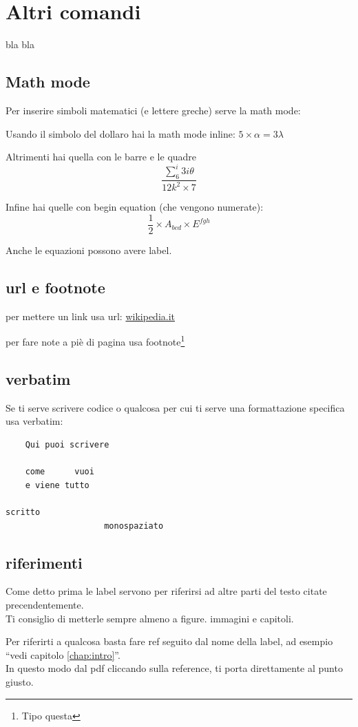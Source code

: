 \documentclass[12pt,a4paper,twoside]{book}
\begin{document}
\chapter{Altri comandi}
bla bla
\section{Math mode}
Per inserire simboli matematici (e lettere greche) serve la math mode:

Usando il simbolo del dollaro hai la math mode inline: $5 \times \alpha = 3\lambda$

Altrimenti hai quella con le barre e le quadre \[ \frac{\sum_6^i 3i\theta}{12k^2\times 7}\]

Infine hai quelle con begin equation (che vengono numerate):
\begin{equation}
    \frac{1}{2}\times A_{bcd}\times E^{fgh}
\end{equation}

Anche le equazioni possono avere label.
\section{url e footnote}
per mettere un link usa url: \url{wikipedia.it}

per fare note a piè di pagina usa footnote\footnote{Tipo questa}
\section{verbatim}
Se ti serve scrivere codice o qualcosa per cui ti serve una formattazione specifica usa verbatim:
\begin{verbatim}
    Qui puoi scrivere

    come      vuoi
    e viene tutto

scritto
                    monospaziato
\end{verbatim}
\section{riferimenti}
Come detto prima le label servono per riferirsi ad altre parti del testo citate precendentemente.\\
Ti consiglio di metterle sempre almeno a figure. immagini e capitoli.

Per riferirti a qualcosa basta fare ref seguito dal nome della label, ad esempio ``vedi capitolo \ref{chap:intro}''.\\In questo modo dal pdf cliccando sulla reference, ti porta direttamente al punto giusto.
\end{document}
